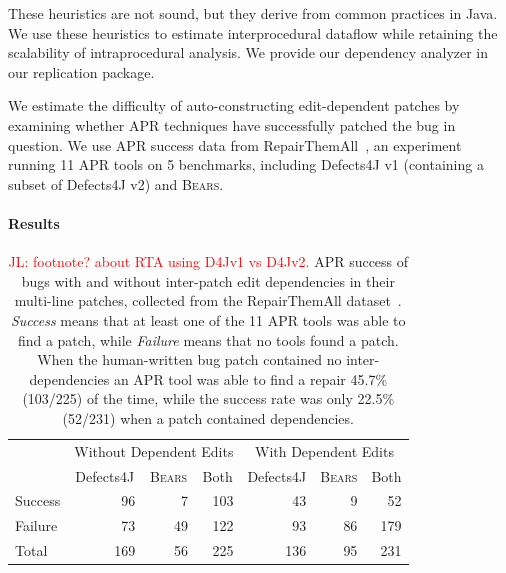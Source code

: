 \documentclass[10pt, conference]{IEEEtran}
\newcommand\todo[1]{\textcolor{red}{#1}}
\newcommand\bears{\textsc{Bears}\xspace}
\begin{document}
These heuristics are not sound, but they derive from common 
practices in Java. We use these heuristics to estimate interprocedural 
dataflow while retaining the scalability of intraprocedural analysis.
We provide our dependency analyzer in our replication package.

We estimate the difficulty of auto-constructing edit-dependent patches 
by examining whether APR techniques have successfully patched the
bug in question. We use APR success data from 
RepairThemAll~\cite{durieux-repair-them-all}, an experiment 
running 11 APR tools on 5 benchmarks, including Defects4J v1
(containing a subset of Defects4J v2) and \bears.

\paragraph{Results}

\begin{table}
{\begin{center}
    \begin{tabular}{lrrrrrr}
        \toprule
        &\multicolumn{3}{c}{Without Dependent Edits} & \multicolumn{3}{c}{With Dependent Edits} \\
        & \multicolumn{1}{c}{Defects4J} & \multicolumn{1}{c}{\bears} & \multicolumn{1}{c}{Both} & \multicolumn{1}{c}{Defects4J} & \multicolumn{1}{c}{\bears} & \multicolumn{1}{c}{Both} \\
        \midrule
        Success & 96 & 7 & 103 & 43 & 9 &  52 \\
        Failure & 73 & 49 & 122 & 93 & 86 & 179\\
        \midrule
        Total  & 169 & 56 & 225 & 136 & 95 & 231\\
        \bottomrule
    \end{tabular}
 \end{center}
}
	\caption{\todo{JL: footnote? about RTA using D4Jv1 vs D4Jv2.} APR success of
      bugs with and without inter-patch edit dependencies in their multi-line
      patches, collected from the RepairThemAll
      dataset~\cite{durieux-repair-them-all}.  \emph{Success} means that at
      least one of the 11 APR tools was able to find a patch, while
      \emph{Failure} means that no tools found a patch. When the human-written
      bug patch contained no inter-dependencies an APR tool was able to find a
      repair 45.7\% (103/225) of the time, while the success rate was only
      22.5\% (52/231) when a patch contained dependencies.}
	\label{tab:dependency-repair-contingency-table}
\end{table}
\end{document}
